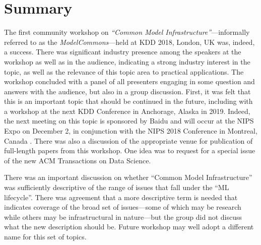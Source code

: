 \documentclass[11pt]{article}
\begin{document}
\section{Summary}

The first community workshop on \emph{``Common Model Infrastructure''}---informally referred to as the \emph{ModelCommons}---held at KDD 2018, London, UK was, indeed, a success. There was significant industry presence among the speakers at the workshop as well as in the audience, indicating a strong industry interest in the topic, as well as the relevance of this topic area to practical applications. The workshop concluded with a panel of all presenters engaging in some question and answers with the audience, but also in a group discussion. First, it was felt that this is an important topic that should be continued in the future, including with a workshop at the next KDD Conference in Anchorage, Alaska in 2019. Indeed, the next meeting on this topic is sponsored by Baidu and will occur at the NIPS Expo on December 2, in conjunction with the NIPS 2018 Conference in Montreal, Canada . There was also a discussion of the appropriate venue for publication of full-length papers from this workshop. One idea was to request for a special issue of the new ACM Transactions on Data Science. 


There was an important discussion on whether ``Common Model Infrastructure'' was sufficiently descriptive of the range of issues that fall under the ``ML lifecycle''. There was agreement that a more descriptive term is needed that indicates coverage of the broad set of issues---some of which may be research while others may be infrastructural in nature---but the group did not discuss what the new description should be. Future workshop may well adopt a different name for this set of topics.
\end{document}
